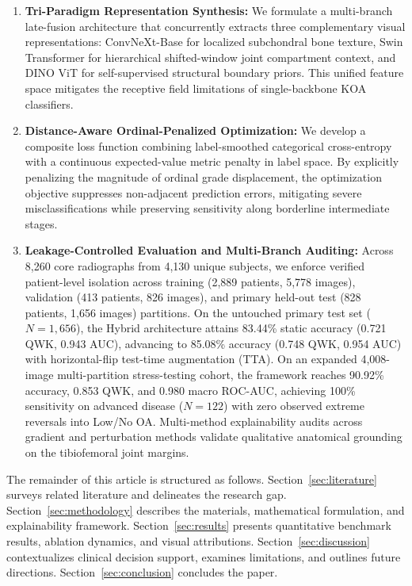 \documentclass[10pt,journal]{IEEEtran}
\begin{document}
\begin{enumerate}[leftmargin=*, label=\arabic*.]
\item \textbf{Tri-Paradigm Representation Synthesis:} We formulate a multi-branch late-fusion architecture that concurrently extracts three complementary visual representations: ConvNeXt-Base for localized subchondral bone texture, Swin Transformer for hierarchical shifted-window joint compartment context, and DINO ViT for self-supervised structural boundary priors. This unified feature space mitigates the receptive field limitations of single-backbone KOA classifiers.

\item \textbf{Distance-Aware Ordinal-Penalized Optimization:} We develop a composite loss function combining label-smoothed categorical cross-entropy with a continuous expected-value metric penalty in label space. By explicitly penalizing the magnitude of ordinal grade displacement, the optimization objective suppresses non-adjacent prediction errors, mitigating severe misclassifications while preserving sensitivity along borderline intermediate stages.

\item \textbf{Leakage-Controlled Evaluation and Multi-Branch Auditing:} Across 8,260 core radiographs from 4,130 unique subjects, we enforce verified patient-level isolation across training (2,889 patients, 5,778 images), validation (413 patients, 826 images), and primary held-out test (828 patients, 1,656 images) partitions. On the untouched primary test set ($N = 1{,}656$), the Hybrid architecture attains 83.44\% static accuracy (0.721 QWK, 0.943 AUC), advancing to 85.08\% accuracy (0.748 QWK, 0.954 AUC) with horizontal-flip test-time augmentation (TTA). On an expanded 4,008-image multi-partition stress-testing cohort, the framework reaches 90.92\% accuracy, 0.853 QWK, and 0.980 macro ROC-AUC, achieving 100\% sensitivity on advanced disease ($N = 122$) with zero observed extreme reversals into Low/No OA. Multi-method explainability audits across gradient and perturbation methods validate qualitative anatomical grounding on the tibiofemoral joint margins.
\end{enumerate}

The remainder of this article is structured as follows. Section~\ref{sec:literature} surveys related literature and delineates the research gap. Section~\ref{sec:methodology} describes the materials, mathematical formulation, and explainability framework. Section~\ref{sec:results} presents quantitative benchmark results, ablation dynamics, and visual attributions. Section~\ref{sec:discussion} contextualizes clinical decision support, examines limitations, and outlines future directions. Section~\ref{sec:conclusion} concludes the paper.
\end{document}
